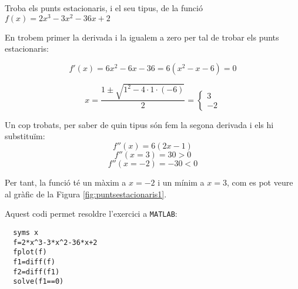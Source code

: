 \Exercise Troba els punts estacionaris, i el seu tipus, de la funció $f(x)=2x^3-3x^2-36x+2$
\label{ex:puntsestacionaris1}
\Answer


En trobem primer la derivada i la igualem a zero per tal de trobar els punts estacionaris:

\[f'(x)=6x^2-6x-36=6(x^2-x-6)=0\]

\[x=\frac{1\pm\sqrt{1^2-4\cdot1\cdot(-6)}}{2}=\left\{\begin{array}{c}3\\-2\end{array}\right.\]

Un cop trobats, per saber de quin tipus són fem la segona derivada i els hi substituïm:
\[f''(x)=6(2x-1)\]
\[f''(x=3)=30>0\]
\[f''(x=-2)=-30<0\]

Per tant, la funció té un màxim a $x=-2$ i un mínim a $x=3$, com es pot veure al gràfic de la Figura \ref{fig:puntsestacionaris1}.

\begin{center}
\begin{minipage}{8cm}
  \label{fig:puntsestacionaris1}
\end{minipage} 
\end{center}

Aquest codi permet resoldre l'exercici a \texttt{MATLAB}:
\begin{lstlisting}[style=Matlab-editor]
  % resolució exercici
  syms x
  f=2*x^3-3*x^2-36*x+2
  fplot(f)
  f1=diff(f)
  f2=diff(f1)
  solve(f1==0)
  \end{lstlisting}


\blacksquare 